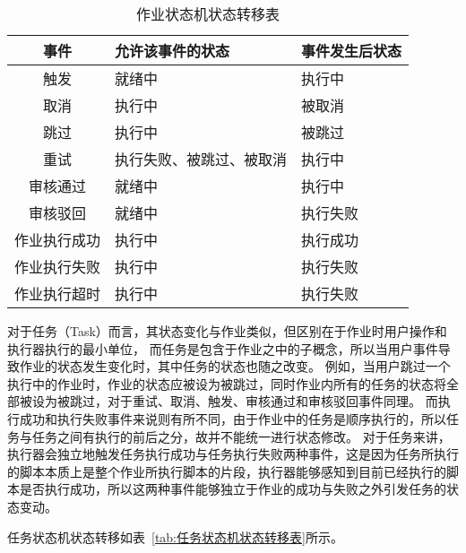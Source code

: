 \begin{table}[h]
  \centering
  \caption{作业状态机状态转移表}
  \label{tab:作业状态机状态转移表}
  \begin{tabular}{cll}
    \toprule
    事件           & 允许该事件的状态          & 事件发生后状态                  \\
    \midrule
    触发           & 就绪中                   & 执行中       \\
    取消           & 执行中                   & 被取消       \\
    跳过           & 执行中                   & 被跳过       \\
    重试           & 执行失败、被跳过、被取消   & 执行中       \\
    审核通过        & 就绪中                   & 执行中        \\
    审核驳回        & 就绪中                   & 执行失败       \\
    作业执行成功     & 执行中      & 执行成功   \\
    作业执行失败     & 执行中      & 执行失败   \\
    作业执行超时     & 执行中      & 执行失败   \\
    \bottomrule
  \end{tabular}
\end{table}

对于任务（Task）而言，其状态变化与作业类似，但区别在于作业时用户操作和执行器执行的最小单位，
而任务是包含于作业之中的子概念，所以当用户事件导致作业的状态发生变化时，其中任务的状态也随之改变。
例如，当用户跳过一个执行中的作业时，作业的状态应被设为被跳过，同时作业内所有的任务的状态将全部被设为被跳过，对于重试、取消、触发、审核通过和审核驳回事件同理。
而执行成功和执行失败事件来说则有所不同，由于作业中的任务是顺序执行的，所以任务与任务之间有执行的前后之分，故并不能统一进行状态修改。
对于任务来讲，执行器会独立地触发任务执行成功与任务执行失败两种事件，这是因为任务所执行的脚本本质上是整个作业所执行脚本的片段，执行器能够感知到目前已经执行的脚本是否执行成功，所以这两种事件能够独立于作业的成功与失败之外引发任务的状态变动。

任务状态机状态转移如表~\ref{tab:任务状态机状态转移表}所示。

